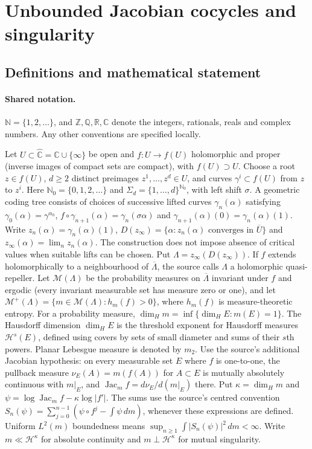 \documentclass[11pt]{article}
\begin{document}
\section{Unbounded Jacobian cocycles and singularity}\label{statement}

\subsection{Definitions and mathematical statement}

\paragraph{Shared notation.}$\mathbb N=\{1,2,\ldots\}$, and $\mathbb Z,\mathbb Q,\mathbb R,\mathbb C$ denote the integers, rationals, reals and complex numbers. Any other conventions are specified locally.


Let $U\subset\widehat{\mathbb C}=\mathbb C\cup\{\infty\}$ be open and $f:U\to f(U)$ holomorphic and proper (inverse images of compact sets are compact), with $f(U)\supset U$. Choose a root $z\in f(U)$, $d\geq2$ distinct preimages $z^1,\ldots,z^d\in U$, and curves $\gamma^i\subset f(U)$ from $z$ to $z^i$. Here $\mathbb N_0=\{0,1,2,\ldots\}$ and $\Sigma_d=\{1,\ldots,d\}^{\mathbb N_0}$, with left shift $\sigma$. A geometric coding tree consists of choices of successive lifted curves $\gamma_n(\alpha)$ satisfying $\gamma_0(\alpha)=\gamma^{\alpha_0}$, $f\circ\gamma_{n+1}(\alpha)=\gamma_n(\sigma\alpha)$ and $\gamma_{n+1}(\alpha)(0)=\gamma_n(\alpha)(1)$. Write $z_n(\alpha)=\gamma_n(\alpha)(1)$, $D(z_\infty)=\{\alpha:z_n(\alpha)\text{ converges in }\overline U\}$ and $z_\infty(\alpha)=\lim_n z_n(\alpha)$. The construction does not impose absence of critical values when suitable lifts can be chosen. Put $\Lambda=z_\infty(D(z_\infty))$. If $f$ extends holomorphically to a neighbourhood of $\overline\Lambda$, the source calls $\Lambda$ a holomorphic quasi-repeller. Let $\mathcal M(\Lambda)$ be the probability measures on $\overline\Lambda$ invariant under $f$ and ergodic (every invariant measurable set has measure zero or one), and let $\mathcal M^+(\Lambda)=\{m\in\mathcal M(\Lambda):h_m(f)>0\}$, where $h_m(f)$ is measure-theoretic entropy. For a probability measure, $\dim_Hm=\inf\{\dim_HE:m(E)=1\}$. The Hausdorff dimension $\dim_H E$ is the threshold exponent for Hausdorff measures $\mathcal H^s(E)$, defined using covers by sets of small diameter and sums of their $s$th powers. Planar Lebesgue measure is denoted by $m_2$. Use the source's additional Jacobian hypothesis: on every measurable set $E$ where $f$ is one-to-one, the pullback measure $\nu_E(A)=m(f(A))$ for $A\subset E$ is mutually absolutely continuous with $m|_E$, and $\operatorname{Jac}_m f=d\nu_E/d(m|_E)$ there. Put $\kappa=\dim_Hm$ and $\psi=\log\operatorname{Jac}_mf-\kappa\log|f'|$. The sums use the source's centred convention $S_n(\psi)=\sum_{j=0}^{n-1}(\psi\circ f^j-\int\psi\,dm)$, whenever these expressions are defined. Uniform $L^2(m)$ boundedness means $\sup_{n\geq1}\int|S_n(\psi)|^2\,dm<\infty$. Write $m\ll\mathcal H^\kappa$ for absolute continuity and $m\perp\mathcal H^\kappa$ for mutual singularity.
\end{document}
